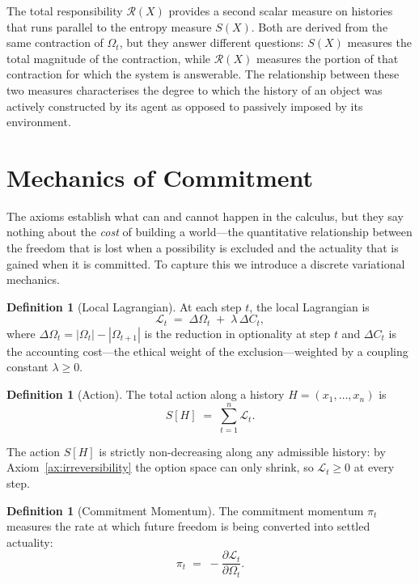 \documentclass[12pt]{article}
\theoremstyle{plain}
\theoremstyle{definition}
\newtheorem{definition}[theorem]{Definition}
\theoremstyle{remark}
\newcommand{\picommit}{\pi}
\newcommand{\Lagrangian}{\mathcal{L}}
\begin{document}
The total responsibility $\mathcal{R}(X)$ provides a second scalar measure on
histories that runs parallel to the entropy measure $S(X)$.  Both are derived
from the same contraction of $\Omega_t$, but they answer different questions:
$S(X)$ measures the total magnitude of the contraction, while $\mathcal{R}(X)$
measures the portion of that contraction for which the system is answerable.
The relationship between these two measures characterises the degree to which
the history of an object was actively constructed by its agent as opposed to
passively imposed by its environment.
\section{Mechanics of Commitment}
\label{sec:lagrangian}

The axioms establish what can and cannot happen in the calculus, but they say
nothing about the \emph{cost} of building a world---the quantitative relationship
between the freedom that is lost when a possibility is excluded and the actuality
that is gained when it is committed.  To capture this we introduce a discrete
variational mechanics.

\begin{definition}[Local Lagrangian]
At each step $t$, the local Lagrangian is
\[
  \Lagrangian_t \;=\; \Delta\Omega_t \;+\; \lambda\,\Delta C_t,
\]
where $\Delta\Omega_t = |\Omega_t| - |\Omega_{t+1}|$ is the reduction in
optionality at step $t$ and $\Delta C_t$ is the accounting cost---the ethical
weight of the exclusion---weighted by a coupling constant $\lambda \geq 0$.
\end{definition}

\begin{definition}[Action]
The total action along a history $H = (x_1, \ldots, x_n)$ is
\[
  S[H] \;=\; \sum_{t=1}^{n} \Lagrangian_t.
\]
\end{definition}

The action $S[H]$ is strictly non-decreasing along any admissible history: by
Axiom~\ref{ax:irreversibility} the option space can only shrink, so
$\Lagrangian_t \geq 0$ at every step.

\begin{definition}[Commitment Momentum]
The commitment momentum $\picommit_t$ measures the rate at which future freedom
is being converted into settled actuality:
\[
  \picommit_t \;=\; -\frac{\partial \Lagrangian_t}{\partial \Omega_t}.
\]
\end{definition}
\end{document}
